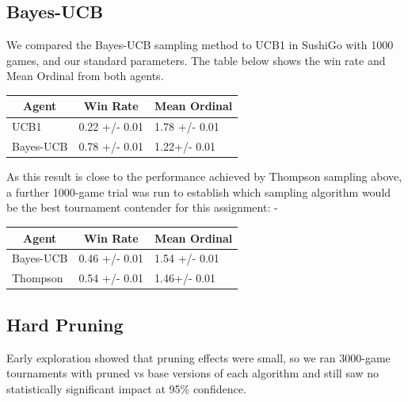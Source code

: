 \documentclass[conference]{IEEEtran}
\begin{document}
\subsection{Bayes-UCB}
We compared the Bayes-UCB sampling method to UCB1 in SushiGo with 1000 games, and our standard parameters. The table below shows the win rate and Mean Ordinal from both agents. 

\begin{table}[H]
\begin{tabular}{|l|l|l|}
\hline
\multicolumn{1}{|c|}{\textbf{Agent}} & \multicolumn{1}{c|}{\textbf{Win Rate}} & \multicolumn{1}{c|}{\textbf{Mean Ordinal}} \\ \hline
UCB1                                 & 0.22 +/- 0.01                          & 1.78 +/- 0.01                              \\ \hline
Bayes-UCB                            & 0.78 +/- 0.01                          & 1.22+/- 0.01                               \\ \hline
\end{tabular}
\end{table}

As this result is close to the performance achieved by Thompson sampling above, a further 1000-game trial was run to establish which sampling algorithm would be the best tournament contender for this assignment: -

\begin{table}[]
\begin{tabular}{|l|l|l|}
\hline
\multicolumn{1}{|c|}{\textbf{Agent}} & \multicolumn{1}{c|}{\textbf{Win Rate}} & \multicolumn{1}{c|}{\textbf{Mean Ordinal}} \\ \hline
Bayes-UCB                            & 0.46 +/- 0.01                          & 1.54 +/- 0.01                              \\ \hline
Thompson                             & 0.54 +/- 0.01                          & 1.46+/- 0.01                               \\ \hline
\end{tabular}
\end{table}

\subsection{Hard Pruning}
Early exploration showed that pruning effects were small, so we ran 3000-game tournaments with pruned vs base versions of each algorithm and still saw no statistically significant impact at 95\% confidence.
\end{document}
